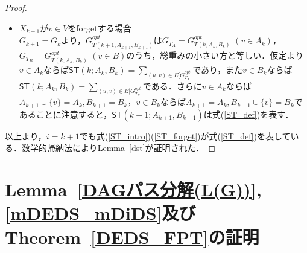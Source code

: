 \documentclass[master]{kuisthesis}		%
\theoremstyle{plain}
\theoremstyle{definition}
\begin{document}
{\begin{proof}
\begin{itemize}
        \item $X_{k+1}$が$v \in V$をforgetする場合 \\
        $G_{k+1} = G_k$より，$G^{opt}_{T(k+1, A_{k+1}, B_{k+1})}$は$G_{T_A} = G^{opt}_{T(k, A_k, B_k)}$ $(v \in A_k)$，$G_{T_B} = G^{opt}_{T(k, A_k, B_k)}$ $(v \in B)$のうち，総重みの小さい方と等しい．仮定より$v \in A_k$ならば$\mathsf{ST}(k; A_k, B_k) = \sum_{(u, v) \in E[G^{opt}_{T_A}}$であり，また$v \in B_k$ならば$\mathsf{ST}(k; A_k, B_k) = \sum_{(u, v) \in E[G^{opt}_{T_B}}$である．さらに$v \in A_k$ならば$A_{k+1} \cup \{v\} = A_k, B_{k+1} = B_k$，$v \in B_k$ならば$A_{k+1} = A_k, B_{k+1} \cup \{v\} = B_k$であることに注意すると，$\mathsf{ST}(k+1; A_{k+1}, B_{k+1})$は式(\ref{ST_def})を表す．
    \end{itemize}
    以上より，$i = k+1$でも式(\ref{ST_intro})(\ref{ST_forget})が式(\ref{ST_def})を表している．数学的帰納法によりLemma~\ref{dst}が証明された．
\end{proof}















\section{Lemma~\ref{DAGパス分解(L(G))}, \ref{mDEDS_mDiDS}及びTheorem~\ref{DEDS_FPT}の証明}


}
\end{document}
